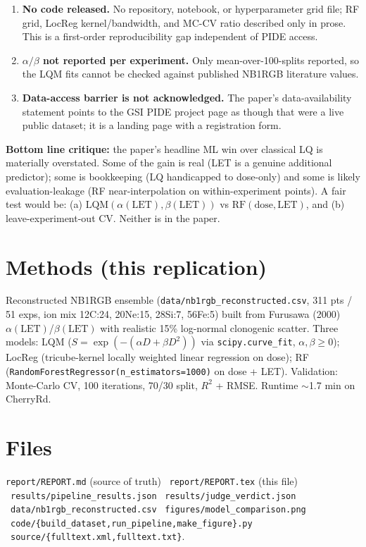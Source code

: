 \documentclass[11pt]{article}
\begin{document}
\begin{enumerate}[leftmargin=*,itemsep=2pt]
  \item \textbf{No code released.} No repository, notebook, or hyperparameter grid file; RF grid, LocReg kernel/bandwidth, and MC-CV ratio described only in prose. This is a first-order reproducibility gap independent of PIDE access.
  \item \textbf{$\alpha/\beta$ not reported per experiment.} Only mean-over-100-splits reported, so the LQM fits cannot be checked against published NB1RGB literature values.
  \item \textbf{Data-access barrier is not acknowledged.} The paper's data-availability statement points to the GSI PIDE project page as though that were a live public dataset; it is a landing page with a registration form.
\end{enumerate}

\textbf{Bottom line critique:} the paper's headline ML win over classical LQ is materially overstated. Some of the gain is real (LET is a genuine additional predictor); some is bookkeeping (LQ handicapped to dose-only) and some is likely evaluation-leakage (RF near-interpolation on within-experiment points). A fair test would be: (a) $\mathrm{LQM}(\alpha(\mathrm{LET}), \beta(\mathrm{LET}))$ vs $\mathrm{RF}(\mathrm{dose}, \mathrm{LET})$, and (b) leave-experiment-out CV. Neither is in the paper.

\section{Methods (this replication)}
Reconstructed NB1RGB ensemble (\texttt{data/nb1rgb\_reconstructed.csv}, 311 pts / 51 exps, ion mix 12C:24, 20Ne:15, 28Si:7, 56Fe:5) built from Furusawa (2000) $\alpha(\mathrm{LET})$/$\beta(\mathrm{LET})$ with realistic 15\% log-normal clonogenic scatter. Three models: LQM ($S = \exp(-(\alpha D + \beta D^2))$ via \texttt{scipy.curve\_fit}, $\alpha, \beta \geq 0$); LocReg (tricube-kernel locally weighted linear regression on dose); RF (\texttt{RandomForestRegressor(n\_estimators=1000)} on dose + LET). Validation: Monte-Carlo CV, 100 iterations, 70/30 split, $R^2$ + RMSE. Runtime $\sim$1.7 min on CherryRd.

\section{Files}
\texttt{report/REPORT.md} (source of truth) \textbullet\ \texttt{report/REPORT.tex} (this file) \textbullet\ \texttt{results/pipeline\_results.json} \textbullet\ \texttt{results/judge\_verdict.json} \textbullet\ \texttt{data/nb1rgb\_reconstructed.csv} \textbullet\ \texttt{figures/model\_comparison.png} \textbullet\ \texttt{code/\{build\_dataset,run\_pipeline,make\_figure\}.py} \textbullet\ \texttt{source/\{fulltext.xml,fulltext.txt\}}.
\end{document}
